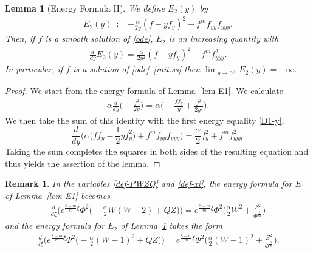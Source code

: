 \documentclass{article}%
\newtheorem{lemma}[theorem]{Lemma}
\newtheorem{remark}[theorem]{Remark}
\newcommand{\alp}{\alpha}
\begin{document}
\begin{lemma}[Energy Formula II]\label{lem-E2}
We define $E_{2}(y)$ by
\begin{align}\label{E2y}
  E_{2}(y)\ := - \frac{\alp}{2y} \left(f - y f_y \right)^2 + f^{m}f_{yy}f_{yyy}.
\end{align}
Then, if $f$ is a smooth solution of \eqref{ode}, $E_{2}$ is an increasing quantity with
\begin{align}\label{D2y} %
  \frac{d}{dy}E_{2}(y) = \frac{\alp}{2 y^2}\left( f - y f_{y} \right)^2 + f^{m}f_{yyy}^{2}.
\end{align}
In particular, if $f$ is a solution of \eqref{ode}--\eqref{init:ss} then $\lim_{y\to 0^+} E_2(y)=-\infty$.
\end{lemma}
\begin{proof}
We start from the energy formula of Lemma~\ref{lem-E1}. We calculate
  \begin{align} \label{sq-term} %
    \alp \frac d{dy} \Big(- \frac{f^2}{2y}\Big) = \alp \Big( - \frac{f f_y}{y} + \frac{f^2}{2y^2} \Big).
  \end{align}
We then take the sum of this identity with the first energy equality \eqref{D1-y},  %
\begin{equation*} %
    \frac{d}{dy} \Big( \alp \big(f f_{y}-\frac{1}{2}y f_{y}^2\big) + f^{m}f_{yy}f_{yyy} \Big) %
    =\frac{\alp}{2}f_{y}^{2} + f^{m}f_{yyy}^{2}.
\end{equation*}
Taking the sum completes the squares in both sides of the resulting equation 
and thus yields the assertion of the lemma.
\end{proof}
\begin{remark}\label{E:DS}
In the variables \eqref{def-PWZQ} and \eqref{def-xi}, the energy formula for $E_{1}$ of Lemma~\ref{lem-E1} becomes
  \begin{align}
    \frac{d}{d\xi}\Big(e^{\frac{8-m}{m}\xi}\Phi^{2}\big(-\frac{\alp}{2}W(W-2)+QZ\big) \Big)
    = e^{\frac{8-m}{m}\xi}\Phi^{2} \Big( \frac{\alp}{2} W^2+ \frac{Z^{2}}{ \Phi^{\frac3m}}\Big)
    \label{E1}
  \end{align}
  and the energy formula for $E_{2}$ of Lemma~\ref{lem-E2} takes the form
  \begin{align}
    \frac{d}{d\xi} \Big( e^{\frac{8-m}{m}\xi}\Phi^{2}\big(-\frac{\alp}{2} ( W - 1 )^{2} + QZ\big) \Big) =
    e^{\frac{8-m}{m}\xi} \Phi^{2} \Big( \frac{\alp}{2}(W - 1)^{2}+ \frac{Z^{2}}{ \Phi^{\frac3m}} \Big).
    \label{E2}%
  \end{align}
\end{remark}
\end{document}
